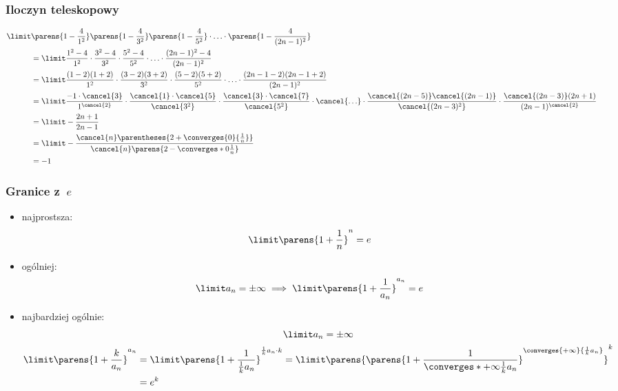 \subsubsection*{Iloczyn teleskopowy}
\begin{equation*}
    \begin{split}
        \limit &\parens{1 - \frac{4}{1^2}}\parens{1 - \frac{4}{3^2}}\parens{1 - \frac{4}{5^2}}\cdot\ldots\cdot\parens{1 - \frac{4}{(2n-1)^2}}\\
            &= \limit \frac{1^2 - 4}{1^2}\cdot\frac{3^2 - 4}{3^2}\cdot\frac{5^2 - 4}{5^2}\cdot\ldots\cdot\frac{(2n-1)^2 - 4}{(2n-1)^2}\\
            &= \limit \frac{(1 - 2)(1 + 2)}{1^2}\cdot\frac{(3 - 2)(3 + 2)}{3^2}\cdot\frac{(5 - 2)(5 + 2)}{5^2}\cdot\ldots\cdot\frac{(2n - 1 - 2)(2n - 1
                + 2)}{(2n-1)^2}\\
            &= \limit \frac{-1\cdot\cancel{3}}{1^{\cancel{2}}}\cdot\frac{\cancel{1}\cdot\cancel{5}}{\cancel{3^2}}\cdot\frac{\cancel{3}\cdot\cancel{7}}
                {\cancel{5^2}}\cdot\cancel{\ldots}\cdot\frac{\cancel{(2n-5)}\cancel{(2n-1)}}{\cancel{(2n-3)^2}}\cdot\frac{\cancel{(2n-3)}(2n+1)}{(2n-1)^
                {\cancel{2}}}\\
            &= \limit -\frac{2n+1}{2n-1}\\
            &= \limit -\frac{\cancel{n}\parentheses{2 + \converges{0}{\frac{1}{n}}}}{\cancel{n}\parens{2 - \converges*{0}{\frac{1}{n}}}}\\
            &= -1
    \end{split}
\end{equation*}
\subsubsection*{Granice z~\(e\)}
\begin{itemize}
    \item najprostsza:
        \begin{equation*}
            \limit \parens{1 + \frac{1}{n}}^n = e
        \end{equation*}
    \item ogólniej:
        \begin{equation*}
            \limit a_n = \pm \infty \implies \limit \parens{1 + \frac{1}{a_n}}^{a_n} = e
        \end{equation*}
    \item najbardziej ogólnie:
        \begin{gather*}
            \limit a_n = \pm \infty\\
            \begin{split}
                \limit \parens{1 + \frac{k}{a_n}}^{a_n} &= \limit \parens{1 + \frac{1}{\frac{1}{k}a_n}}^{\frac{1}{k}a_n \cdot k}
                    = \limit \parens{\parens{1 + \frac{1}{\converges*{+\infty}{\frac{1}{k}a_n}}}^{\converges{+\infty}{\frac{1}{k}a_n}}}^k\\
                    &= e^k
            \end{split}
        \end{gather*}
\end{itemize}
